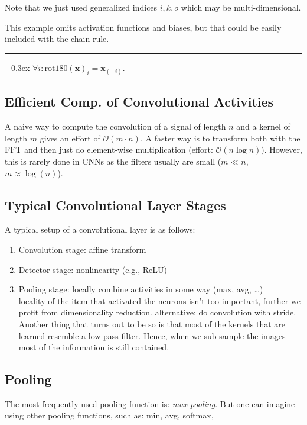 \documentclass[a2paper,8pt]{extarticle}
\newcommand{\BigO}{\mathcal{O}}
\renewcommand{\vec}[1]{\mathbf{#1}}
\newcommand{\vx}{\vec{x}}
\newcommand{\customboxpaddingsize}{0pt}
\newcommand{\emptyarg}[1][]{\ifthenelse{\isempty{#1}}{}{\ (#1)}}
\newcommand{\Def}[1][]{{\setlength\fboxsep{\customboxpaddingsize}
\colorbox{defcolor}{%
\color{custtitlecolor}{\textbf{D.\emptyarg[#1]}}}\kern+0.3ex}}
\newcommand{\sep}{\vspace{0pt}\noindent\hrule\vspace{0pt}}
\newcommand{\sep}{\vspace{5pt}\noindent\hrule\vspace{5pt}}
\begin{document}
\begin{landscape}
\begin{multicols*}{7}
Note that we just used generalized indices $i,k,o$ which may be
multi-dimensional.

This example omits activation functions and biases, but that could be easily
included with the chain-rule.

\sep

\Def[Rotation180] $\forall i\colon\text{rot180}(\vx)_i=\vx_{(-i)}.$

\subsection{Efficient Comp. of Convolutional Activities}

A naive way to compute the convolution of a signal of length $n$ and a kernel of
length $m$ gives an effort of $\BigO(m\cdot n)$. A faster way is to transform
both with the FFT and then just do element-wise multiplication (effort:
$\BigO(n\log n)$). However, this is rarely done in CNNs as the filters usually
are small ($m\ll n$, $m\approx \log(n)$).

\subsection{Typical Convolutional Layer Stages}

A typical setup of a convolutional layer is as follows:

\begin{enumerate}
  \item Convolution stage: affine transform
  \item Detector stage: nonlinearity (e.g., ReLU)
  \item Pooling stage: locally combine activities in some way (max, avg,
  \ldots)\\
  locality of the item that activated the neurons isn't too important, further
  we profit from dimensionality reduction. alternative: do convolution with
  stride. Another thing that turns out to be so is that most of the kernels that are
learned resemble a low-pass filter. Hence, when we sub-sample the images most of
the information is still contained.
\end{enumerate}

\subsection{Pooling}

The most frequently used pooling function is: \emph{max pooling}. But one
can imagine using other pooling functions, such as: min, avg, softmax,


\end{multicols*}
\end{landscape}
\end{document}
